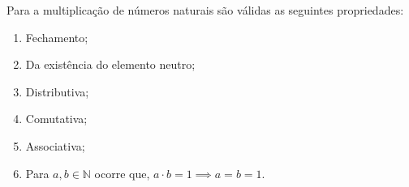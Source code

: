 \documentclass[../main.tex]{subfiles}
\begin{document}
\begin{teo}
    Para a multiplicação de números naturais são válidas as seguintes propriedades:
    \begin{enumerate}[label=(\roman*)]
        \item Fechamento;
        \item Da existência do elemento neutro; 
        \item Distributiva;
        \item Comutativa;
        \item Associativa;
        \item Para $a,b \in \mathbb{N}$ ocorre que, $a \cdot b = 1 \implies a = b = 1$.
    \end{enumerate}
\end{teo}
\end{document}
